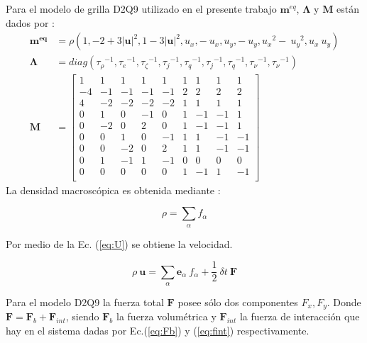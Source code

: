Para el modelo de grilla D2Q9 utilizado en el presente trabajo $\mathbf{m}^{eq}$, $ \mathbf{\Lambda}$ y $\mathbf{M}$ están dados por \cite{kruger2017lattice}:
{\footnotesize
\begin{align}
\mathbf{m^{eq}} & =  \rho  \left( 1, - 2 + 3 {|\mathbf{u}|}^{2} , 1 - 3{|\mathbf{u}|}^{2} , u_{x} , -\> u_{x} , u_{y} , -\> u_{y} , {u_{x}}^{2} -\> {u_{y}}^{2} , u_{x} \> u_{y} \right) \label{eq:m}\\
%
    \mathbf{\Lambda}  & = diag ( {\tau_{\rho }}^{-1},{\tau_{e}}^{-1},{\tau_{\zeta }}^{-1},{\tau_{j}}^{-1},{\tau_{q}}^{-1},{\tau_{j}}^{-1},{\tau_{q}}^{-1},{\tau_{\nu }}^{-1},{\tau_{\nu}}^{-1}) \\
\mathbf{M} & =
\begin{bmatrix}
1 & 1 & 1 & 1 & 1 & 1 & 1 & 1 & 1 \\
-4 &-1 &-1 &-1 &-1 & 2 & 2 & 2 & 2 \\
4 &-2 &-2 &-2 &-2 & 1 & 1 & 1 & 1 \\
0 & 1 & 0 &-1 & 0 & 1 &-1 &-1 & 1 \\
0 &-2 & 0 & 2 & 0 & 1 &-1 &-1 & 1 \\
0 & 0 & 1 & 0 &-1 & 1 & 1 &-1 &-1 \\
0 & 0 &-2 & 0 & 2 & 1 & 1 &-1 &-1 \\
0 & 1 &-1 & 1 &-1 & 0 & 0 & 0 & 0 \\    
0 & 0 & 0 & 0 & 0 & 1 &-1 & 1 &-1 \\        
\end{bmatrix}
\label{eq:matriz_m}
\end{align}
}
La densidad macroscópica es obtenida mediante :

\begin{equation}
        \rho = \sum_{\alpha} f_{\alpha}
        \label{eq:rho}
\end{equation}

Por medio de la Ec. (\ref{eq:U}) se obtiene la velocidad.

\begin{equation}
    \rho \> \mathbf{u} = \sum_{\alpha} {\mathbf{e}}_{\alpha} \> f_{\alpha} + \frac{1}{2} \> {\delta}{t} \> \mathbf{F}
    \label{eq:U}
\end{equation}

Para el modelo D2Q9 la fuerza total $\mathbf{F}$ posee sólo dos componentes $F_{x} , F_{y}$. Donde $ {\mathbf{F}} = {\mathbf{F}}_{b} + {\mathbf{F}}_{int} $, siendo ${\mathbf{F}}_{b}$ la fuerza volumétrica y ${\mathbf{F}}_{int}$ la fuerza de interacción que hay en el sistema dadas por Ec.(\ref{eq:Fb}) y (\ref{eq:fint}) respectivamente.

